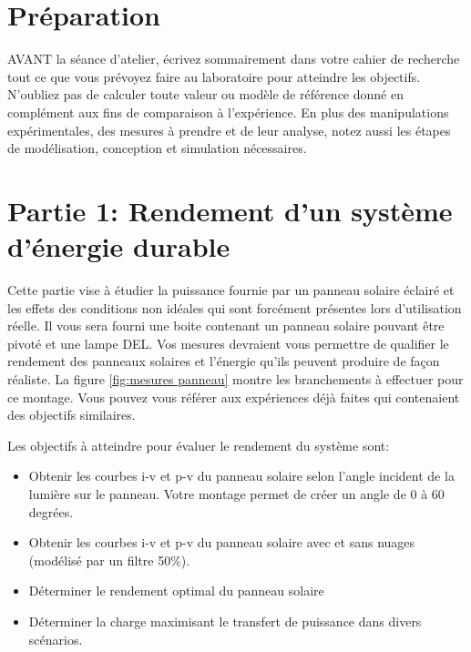 \documentclass[canadien,12pt,oneside,letterpaper]{article}
\begin{document}
\section{Préparation}\label{sec:preparation}
\vspace{-2ex}
AVANT la séance d’atelier, écrivez sommairement dans votre cahier de recherche
tout ce que vous prévoyez faire au laboratoire pour atteindre les objectifs. N’oubliez
pas de calculer toute valeur ou modèle de référence donné en complément aux fins de
comparaison à l’expérience. En plus des manipulations expérimentales, des mesures
à prendre et de leur analyse, notez aussi les étapes de modélisation, conception et
simulation nécessaires. 


\section{Partie 1: Rendement d'un système d'énergie durable}\label{sec:partie1}
\vspace{-2ex}

Cette partie vise à étudier la puissance fournie par un panneau solaire éclairé et les effets des conditions non idéales qui sont forcément présentes lors d'utilisation réelle. Il vous sera fourni une boite contenant un panneau solaire pouvant être pivoté et une lampe DEL. Vos mesures devraient vous permettre de qualifier le rendement des panneaux solaires et l'énergie qu'ils peuvent produire de façon réaliste. La figure \ref{fig:mesures panneau} montre les branchements à effectuer pour ce montage. Vous pouvez vous référer aux expériences déjà faites qui contenaient des objectifs similaires.



 
Les objectifs à atteindre pour évaluer le rendement du système sont:
\begin{itemize}
\item Obtenir les courbes i-v et p-v du panneau solaire selon l'angle incident de la lumière sur le panneau. Votre montage permet de créer un angle de 0 à 60 degrées.
\item Obtenir les courbes i-v et p-v du panneau solaire avec et sans nuages (modélisé par un filtre 50\%).
\item Déterminer le rendement optimal du panneau solaire
\item Déterminer la charge maximisant le transfert de puissance dans divers scénarios.
\end{itemize}

\end{document}
